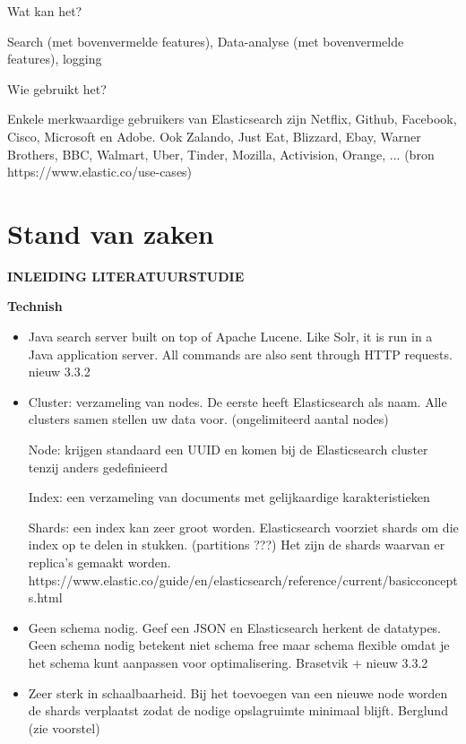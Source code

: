 {Wat kan het? 

Search (met bovenvermelde features), Data-analyse (met bovenvermelde features), logging 

Wie gebruikt het? 

Enkele merkwaardige gebruikers van Elasticsearch zijn Netflix, Github, Facebook, Cisco, Microsoft en Adobe. Ook Zalando, Just Eat, Blizzard, Ebay, Warner Brothers, BBC, Walmart, Uber, Tinder, Mozilla, Activision, Orange, ... (bron https://www.elastic.co/use-cases)

\section{Stand van zaken}
\label{sec:stand-van-zaken}

\textbf{INLEIDING LITERATUURSTUDIE}

\textbf{Technish}

\begin{itemize}
	\item  Java search server built on top of Apache Lucene. Like Solr, it is run in a Java
	application server. All commands are also sent through HTTP requests. nieuw 3.3.2
	\item Cluster: verzameling van nodes. De eerste heeft Elasticsearch als naam. Alle clusters samen stellen uw data voor. (ongelimiteerd aantal nodes) 
	
	Node: krijgen standaard een UUID en komen bij de Elasticsearch cluster tenzij anders gedefinieerd 
	
	Index: een verzameling van documents met gelijkaardige karakteristieken 
	
	Shards: een index kan zeer groot worden. Elasticsearch voorziet shards om die index op te delen in stukken. (partitions ???) Het zijn de shards waarvan er replica's gemaakt worden. https://www.elastic.co/guide/en/elasticsearch/reference/current/\textunderscore basic\textunderscore concepts.html
	\item Geen schema nodig. Geef een JSON en Elasticsearch herkent de datatypes. Geen schema nodig betekent niet schema free maar schema flexible omdat je het schema kunt aanpassen voor optimalisering. Brasetvik + nieuw 3.3.2
	
	\item Zeer sterk in schaalbaarheid. Bij het toevoegen van een nieuwe node worden de shards verplaatst zodat de nodige opslagruimte minimaal blijft. Berglund (zie voorstel)  
	

\end{itemize}}
